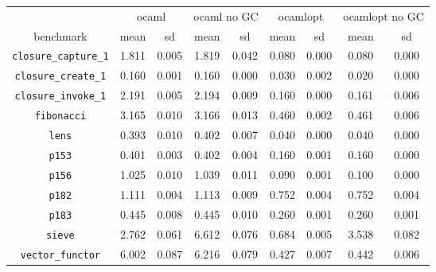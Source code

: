\documentclass[12pt,a4paper,twoside,openright]{report}
\begin{document}
\begin{figure}[h]
\begin{tabular}{| c | c c | c c | c c | c c |}
  \hline
  & \multicolumn{2}{c|}{ocaml}
  & \multicolumn{2}{c|}{ocaml no GC}
  & \multicolumn{2}{c|}{ocamlopt}
  & \multicolumn{2}{c|}{ocamlopt no GC}
  \\
benchmark                     & mean  & sd    & mean  & sd    & mean  & sd    & mean  & sd \\
  \hline
\lstinline!closure_capture_1! & \cellcolor[hsb]{0.3,0.000,1}1.811 & 0.005 & \cellcolor[hsb]{0.0,0.002,1}1.819 & 0.042 & \cellcolor[hsb]{0.3,0.956,1}0.080 & 0.000 & \cellcolor[hsb]{0.3,0.956,1}0.080 & 0.000 \\
\lstinline!closure_create_1!  & \cellcolor[hsb]{0.3,0.000,1}0.160 & 0.001 & \cellcolor[hsb]{0.3,0.001,1}0.160 & 0.000 & \cellcolor[hsb]{0.3,0.810,1}0.030 & 0.002 & \cellcolor[hsb]{0.3,0.875,1}0.020 & 0.000 \\
\lstinline!closure_invoke_1!  & \cellcolor[hsb]{0.3,0.000,1}2.191 & 0.005 & \cellcolor[hsb]{0.0,0.000,1}2.194 & 0.009 & \cellcolor[hsb]{0.3,0.927,1}0.160 & 0.000 & \cellcolor[hsb]{0.3,0.927,1}0.161 & 0.006 \\
\lstinline!fibonacci!         & \cellcolor[hsb]{0.3,0.000,1}3.165 & 0.010 & \cellcolor[hsb]{0.3,0.000,1}3.166 & 0.013 & \cellcolor[hsb]{0.3,0.855,1}0.460 & 0.002 & \cellcolor[hsb]{0.3,0.854,1}0.461 & 0.006 \\
\lstinline!lens!              & \cellcolor[hsb]{0.3,0.000,1}0.393 & 0.010 & \cellcolor[hsb]{0.0,0.012,1}0.402 & 0.007 & \cellcolor[hsb]{0.3,0.898,1}0.040 & 0.000 & \cellcolor[hsb]{0.3,0.898,1}0.040 & 0.000 \\
\lstinline!p153!              & \cellcolor[hsb]{0.3,0.000,1}0.401 & 0.003 & \cellcolor[hsb]{0.0,0.001,1}0.402 & 0.004 & \cellcolor[hsb]{0.3,0.601,1}0.160 & 0.001 & \cellcolor[hsb]{0.3,0.601,1}0.160 & 0.000 \\
\lstinline!p156!              & \cellcolor[hsb]{0.3,0.000,1}1.025 & 0.010 & \cellcolor[hsb]{0.0,0.007,1}1.039 & 0.011 & \cellcolor[hsb]{0.3,0.912,1}0.090 & 0.001 & \cellcolor[hsb]{0.3,0.902,1}0.100 & 0.000 \\
\lstinline!p182!              & \cellcolor[hsb]{0.3,0.000,1}1.111 & 0.004 & \cellcolor[hsb]{0.0,0.000,1}1.113 & 0.009 & \cellcolor[hsb]{0.3,0.323,1}0.752 & 0.004 & \cellcolor[hsb]{0.3,0.323,1}0.752 & 0.004 \\
\lstinline!p183!              & \cellcolor[hsb]{0.3,0.000,1}0.445 & 0.008 & \cellcolor[hsb]{0.3,0.000,1}0.445 & 0.010 & \cellcolor[hsb]{0.3,0.416,1}0.260 & 0.001 & \cellcolor[hsb]{0.3,0.416,1}0.260 & 0.001 \\
\lstinline!sieve!             & \cellcolor[hsb]{0.3,0.000,1}2.762 & 0.061 & \cellcolor[hsb]{0.0,0.697,1}6.612 & 0.076 & \cellcolor[hsb]{0.3,0.752,1}0.684 & 0.005 & \cellcolor[hsb]{0.0,0.141,1}3.538 & 0.082 \\
\lstinline!vector_functor!    & \cellcolor[hsb]{0.3,0.000,1}6.002 & 0.087 & \cellcolor[hsb]{0.0,0.018,1}6.216 & 0.079 & \cellcolor[hsb]{0.3,0.929,1}0.427 & 0.007 & \cellcolor[hsb]{0.3,0.926,1}0.442 & 0.006 \\
\hline
\end{tabular}


\end{figure}
\end{document}
